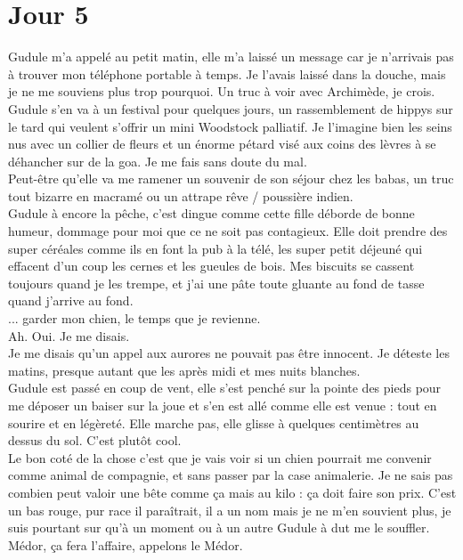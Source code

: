 \chapter*{Jour 5}
Gudule m'a appelé au petit matin, elle m'a laissé un message car je n'arrivais pas à trouver mon téléphone portable à temps. Je l'avais laissé dans la douche, mais je ne me souviens plus trop pourquoi. Un truc à voir avec Archimède, je crois. \\

Gudule s'en va à un festival pour quelques jours, un rassemblement de hippys sur le tard qui veulent s'offrir un mini Woodstock palliatif. Je l'imagine bien les seins nus avec un collier de fleurs et un énorme pétard visé aux coins des lèvres à se déhancher sur de la goa. Je me fais sans doute du mal. \\
Peut-être qu'elle va me ramener un souvenir de son séjour chez les babas, un truc tout bizarre en macramé ou un attrape rêve / poussière indien. \\

Gudule à encore la pêche, c'est dingue comme cette fille déborde de bonne humeur, dommage pour moi que ce ne soit pas contagieux. Elle doit prendre des super céréales comme ils en font la pub à la télé, les super petit déjeuné qui effacent d'un coup les cernes et les gueules de bois. Mes biscuits se cassent toujours quand je les trempe, et j'ai une pâte toute gluante au fond de tasse quand j'arrive au fond. \\

... garder mon chien, le temps que je revienne. \\

Ah. Oui. Je me disais. \\
Je me disais qu'un appel aux aurores ne pouvait pas être innocent. Je déteste les matins, presque autant que les après midi et mes nuits blanches. \\

Gudule est passé en coup de vent, elle s'est penché sur la pointe des pieds pour me déposer un baiser sur la joue et s'en est allé comme elle est venue : tout en sourire et en légèreté. Elle marche pas, elle glisse à quelques centimètres au dessus du sol. C'est plutôt cool. \\

Le bon coté de la chose c'est que je vais voir si un chien pourrait me convenir comme animal de compagnie, et sans passer par la case animalerie. Je ne sais pas combien peut valoir une bête comme ça mais au kilo : ça doit faire son prix. C'est un bas rouge, pur race il paraîtrait, il a un nom mais je ne m'en souvient plus, je suis pourtant sur qu'à un moment ou à un autre Gudule à dut me le souffler. Médor, ça fera l'affaire, appelons le Médor. \\

